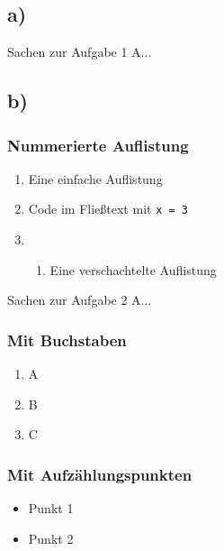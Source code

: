 \rhead{}

\subsection*{a)}
Sachen zur Aufgabe 1 A...

\subsection*{b)}
\subsubsection*{Nummerierte Auflistung}
\begin{enumerate}
	\item Eine einfache Auflistung
	\item Code im Fließtext mit \texttt{x = 3}
	\item \begin{enumerate}
		      \item Eine verschachtelte Auflistung
	      \end{enumerate}
\end{enumerate}

\newpage


Sachen zur Aufgabe 2 A...

\subsubsection*{Mit Buchstaben}
\begin{enumerate}
	\item A
	\item B
	\item C
\end{enumerate}

\subsubsection*{Mit Aufzählungspunkten}
\begin{itemize}
	\item Punkt 1
	\item Punkt 2
\end{itemize}
